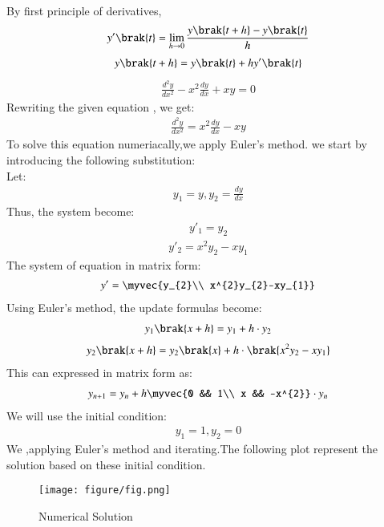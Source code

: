 \documentclass[journal]{IEEEtran}
\begin{document}
 \solution 
  By first principle of derivatives,
  \begin{align}
      y'\brak{t}= \lim_{h \to 0} \frac{y\brak{t+h}-y\brak{t}}{h}
  \end{align}
  \begin{align}
      y\brak{t+h} = y\brak{t}+hy'\brak{t}
  \end{align}
  \begin{align}
  \frac{d^{2}y}{dx^{2}}-x^{2}\frac{dy}{dx}+xy=0
  \end{align}
  Rewriting the given equation , we get:
  \begin{align}
      \frac{d^{2}y}{dx^{2}}=x^{2}\frac{dy}{dx}-xy
  \end{align}
  To solve this equation numeriacally,we apply Euler's method. we start by introducing the following substitution:\\
  Let:
  \begin{align}
      y_{1}=y, y_{2} = \frac{dy}{dx} 
  \end{align}
  Thus, the system become:
  \begin{align}
      y'_{1}=y_{2}
  \end{align}
  \begin{align}
      y'_{2}=x^{2}y_{2}-xy_{1}
  \end{align}
  The system of equation in matrix form:
  \begin{align}
      y'=\myvec{y_{2}\\
                  x^{2}y_{2}-xy_{1}}
  \end{align}
  Using Euler's method, the update formulas become:
  \begin{align}
      y_{1}\brak{x+h}=y_{1}+h\cdot y_{2}
  \end{align}
  \begin{align}
      y_{2}\brak{x+h}=y_{2}\brak{x}+h\cdot\brak{x^{2}y_{2}-xy_{1}}
  \end{align}
  This can expressed in matrix form as:
  \begin{align}
      y_{n+1}=y_{n}+h\myvec{0 && 1\\
                            x && -x^{2}}\cdot y_{n}
  \end{align}
  We will use the initial condition:
  \begin{align}
      y_{1}=1,   y_{2}=0
  \end{align}
  We ,applying Euler's method and iterating.The following plot represent the solution based on these initial condition.
  \begin{figure}[h!]
   \centering
   \texttt{[image: figure/fig.png]} 
   \caption{Numerical Solution}
   \label{stemplot}
\end{figure}
\end{document}
